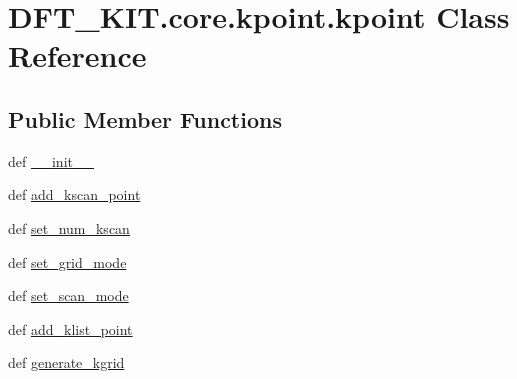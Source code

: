 \hypertarget{class_d_f_t___k_i_t_1_1core_1_1kpoint_1_1kpoint}{\section{D\+F\+T\+\_\+\+K\+I\+T.\+core.\+kpoint.\+kpoint Class Reference}
\label{class_d_f_t___k_i_t_1_1core_1_1kpoint_1_1kpoint}
}
\subsection*{Public Member Functions}
\begin{DoxyCompactItemize}
\item 
def \hyperlink{class_d_f_t___k_i_t_1_1core_1_1kpoint_1_1kpoint_a61ad985bc0bbed1f84ee5e9aba623d1a}{\+\_\+\+\_\+init\+\_\+\+\_\+}
\item 
def \hyperlink{class_d_f_t___k_i_t_1_1core_1_1kpoint_1_1kpoint_a43366b10ba787558a4e76a411336ebaa}{add\+\_\+kscan\+\_\+point}
\item 
def \hyperlink{class_d_f_t___k_i_t_1_1core_1_1kpoint_1_1kpoint_a0e802a95a55a1441bb6fc3a72be7da7a}{set\+\_\+num\+\_\+kscan}
\item 
def \hyperlink{class_d_f_t___k_i_t_1_1core_1_1kpoint_1_1kpoint_a6208ad1eb7a2edf015d75ac552cd4235}{set\+\_\+grid\+\_\+mode}
\item 
def \hyperlink{class_d_f_t___k_i_t_1_1core_1_1kpoint_1_1kpoint_ae961483c9c1726af28a04bcb45770e2c}{set\+\_\+scan\+\_\+mode}
\item 
def \hyperlink{class_d_f_t___k_i_t_1_1core_1_1kpoint_1_1kpoint_af89830eda197861c761d0744685be11a}{add\+\_\+klist\+\_\+point}
\item 
def \hyperlink{class_d_f_t___k_i_t_1_1core_1_1kpoint_1_1kpoint_a6cd9fa31b0812f2b14ebda4b2b8cdff6}{generate\+\_\+kgrid}
\end{DoxyCompactItemize}
